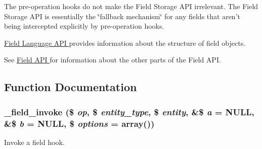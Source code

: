 The pre-\/operation hooks do not make the Field Storage API irrelevant. The Field Storage API is essentially the \char`\"{}fallback mechanism\char`\"{} for any fields that aren't being intercepted explicitly by pre-\/operation hooks.

\hyperlink{group__field__language}{Field Language API } provides information about the structure of field objects.

See \hyperlink{group__field}{Field API } for information about the other parts of the Field API. 

\subsection{Function Documentation}
\hypertarget{group__field__attach_ga65f891a5eea6513f8505f5cfc5894896}{
\subsubsection[{\_\-field\_\-invoke}]{\setlength{\rightskip}{0pt plus 5cm}\_\-field\_\-invoke (\$ {\em op}, \/  \$ {\em entity\_\-type}, \/  \$ {\em entity}, \/  \&\$ {\em a} = {\ttfamily NULL}, \/  \&\$ {\em b} = {\ttfamily NULL}, \/  \$ {\em options} = {\ttfamily array()})}}
\label{group__field__attach_ga65f891a5eea6513f8505f5cfc5894896}
Invoke a field hook.



